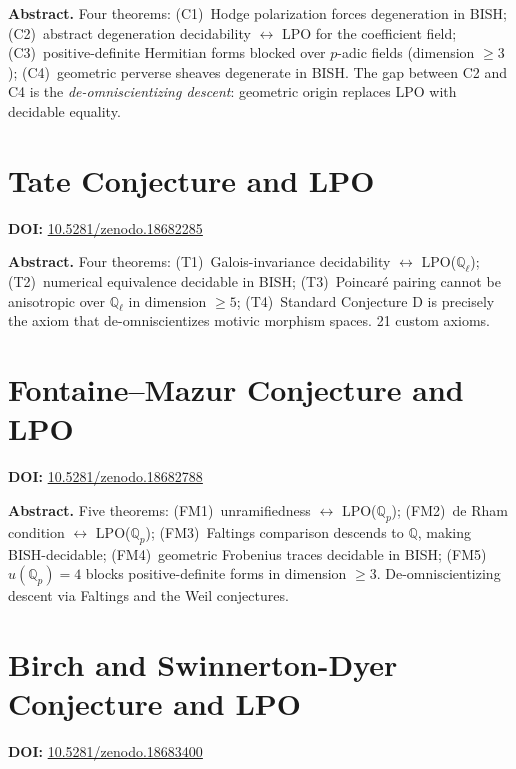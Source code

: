 \documentclass[11pt,a4paper]{article}
\begin{document}
\bigskip
\noindent\textbf{Abstract.}
Four theorems: (C1)~Hodge polarization forces degeneration in BISH; (C2)~abstract degeneration decidability $\leftrightarrow$ LPO for the coefficient field; (C3)~positive-definite Hermitian forms blocked over $p$-adic fields (dimension $\ge3$); (C4)~geometric perverse sheaves degenerate in BISH. The gap between C2 and C4 is the \emph{de-omniscientizing descent}: geometric origin replaces LPO with decidable equality.

\section{Tate Conjecture and LPO}
\label{sec:p46}
\textbf{DOI:} \href{https://doi.org/10.5281/zenodo.18682285}{10.5281/zenodo.18682285}

\bigskip
\noindent\textbf{Abstract.}
Four theorems: (T1)~Galois-invariance decidability $\leftrightarrow$ LPO($\mathbb{Q}_\ell$); (T2)~numerical equivalence decidable in BISH; (T3)~Poincar\'e pairing cannot be anisotropic over $\mathbb{Q}_\ell$ in dimension $\ge5$; (T4)~Standard Conjecture D is precisely the axiom that de-omniscientizes motivic morphism spaces. 21 custom axioms.

\section{Fontaine--Mazur Conjecture and LPO}
\label{sec:p47}
\textbf{DOI:} \href{https://doi.org/10.5281/zenodo.18682788}{10.5281/zenodo.18682788}

\bigskip
\noindent\textbf{Abstract.}
Five theorems: (FM1)~unramifiedness $\leftrightarrow$ LPO($\mathbb{Q}_p$); (FM2)~de Rham condition $\leftrightarrow$ LPO($\mathbb{Q}_p$); (FM3)~Faltings comparison descends to $\mathbb{Q}$, making BISH-decidable; (FM4)~geometric Frobenius traces decidable in BISH; (FM5)~$u(\mathbb{Q}_p)=4$ blocks positive-definite forms in dimension $\ge3$. De-omniscientizing descent via Faltings and the Weil conjectures.

\section{Birch and Swinnerton-Dyer Conjecture and LPO}
\label{sec:p48}
\textbf{DOI:} \href{https://doi.org/10.5281/zenodo.18683400}{10.5281/zenodo.18683400}
\end{document}
